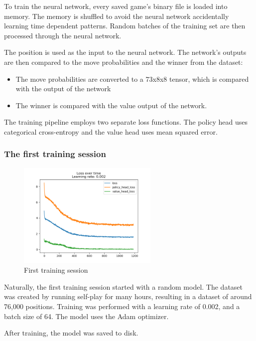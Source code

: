 \documentclass{article}
\begin{document}
To train the neural network, every saved game's binary file is loaded 
into memory. The memory is shuffled to avoid the neural network accidentally learning
time dependent patterns. Random batches of the training set are then processed through the
neural network.

The position is used as the input to the neural network. The network's outputs are then 
compared to the move probabilities and the winner from the dataset:

\begin{itemize}
    \item The move probabilities are converted to a 73x8x8 tensor, which is compared with the output of the network
    \item The winner is compared with the value output of the network.
\end{itemize}

The training pipeline employs two separate loss functions. The policy head uses categorical cross-entropy
and the value head uses mean squared error.

\subsubsection{The first training session}

\begin{figure}[H]
    \centering
    \includegraphics[width=0.6\textwidth]{img/first-training.png}
    \caption{First training session}
\end{figure}

Naturally, the first training session started with a random model. 
The dataset was created by running self-play for many hours, resulting in a dataset of around
76,000 positions. Training was performed with a learning rate of 0.002, and a batch size of 64.
The model uses the Adam optimizer.

After training, the model was saved to disk.
\end{document}
